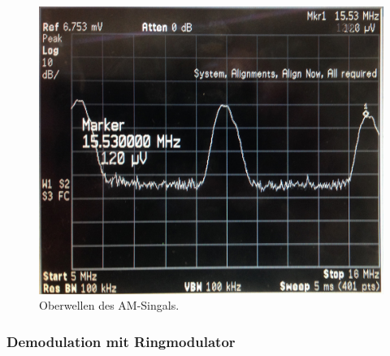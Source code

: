 \begin{figure}
    \centering
    \includegraphics[width=0.8\linewidth]{images/am-diode-oberwellen.jpg}
    \caption{
        Oberwellen des AM-Singals.
    }
    \label{fig:am-diode-oberwellen}
\end{figure}

\subsubsection{Demodulation mit Ringmodulator}
\label{subsubsec:am-demodulation-ring}

